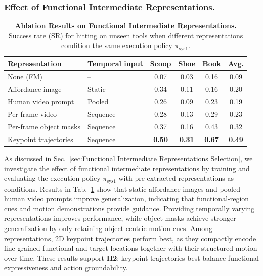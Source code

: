 \subsubsection{Effect of Functional Intermediate Representations.}

\begin{table}[ht]
\centering
\caption{\textbf{Ablation Results on Functional Intermediate Representations.} Success rate (SR) for hitting on unseen tools when different representations condition the same execution policy $\pi_{\mathrm{sys1}}$.}
\label{tab:ablation_intermediate_representation}
\small

\begin{tabular*}{0.9\linewidth}{
@{\extracolsep{\fill}}
llccc>{\columncolor{gray!12}}c
}
\toprule
Representation & Temporal input & Scoop & Shoe & Book & \cellcolor{white}Avg. \\
\midrule
None (FM) & -- & 0.07 & 0.03 & 0.16 & 0.09 \\
Affordance image & Static & 0.34 & 0.11 & 0.16 & 0.20 \\
Human video prompt & Pooled & 0.26 & 0.09 & 0.23 & 0.19 \\
\midrule
Per-frame video & Sequence & 0.28 & 0.13 & 0.29 & 0.23 \\
Per-frame object masks & Sequence & 0.37 & 0.16 & 0.43 & 0.32 \\
Keypoint trajectories & Sequence &
\textbf{0.50} & \textbf{0.31} & \textbf{0.67} & \textbf{0.49} \\
\bottomrule
\end{tabular*}

\end{table}

As discussed in Sec.~\ref{sec:Functional Intermediate Representations Selection}, we investigate the effect of functional intermediate representations by training and evaluating the execution policy $\pi_{\mathrm{sys1}}$ with pre-extracted representations as conditions.
Results in Tab.~\ref{tab:ablation_intermediate_representation} show that static affordance images and pooled human video prompts improve generalization, indicating that functional-region cues and motion demonstrations provide guidance.
Providing temporally varying representations improves performance, while object masks achieve stronger generalization by only retaining object-centric motion cues.
Among representations, 2D keypoint trajectories perform best, as they compactly encode fine-grained functional and target locations together with their structured motion over time.
These results support \textbf{H2}: keypoint trajectories best balance functional expressiveness and action groundability.



